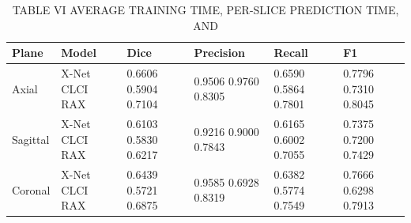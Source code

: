 \begin{table}[htbp]
\centering
\caption{TABLE VI AVERAGE TRAINING TIME, PER-SLICE PREDICTION TIME, AND}
\label{tab:table\_005}
\begin{tabular}{llllll}
\hline
Plane & Model & Dice & Precision & Recall & F1 \\
\hline
Axial & X-Net CLCI RAX & 0.6606 0.5904 0.7104 & 0.9506 0.9760 0.8305 & 0.6590 0.5864 0.7801 & 0.7796 0.7310 0.8045 \\
Sagittal & X-Net CLCI RAX & 0.6103 0.5830 0.6217 & 0.9216 0.9000 0.7843 & 0.6165 0.6002 0.7055 & 0.7375 0.7200 0.7429 \\
Coronal & X-Net CLCI RAX & 0.6439 0.5721 0.6875 & 0.9585 0.6928 0.8319 & 0.6382 0.5774 0.7549 & 0.7666 0.6298 0.7913 \\
\hline
\end{tabular}
\end{table}
